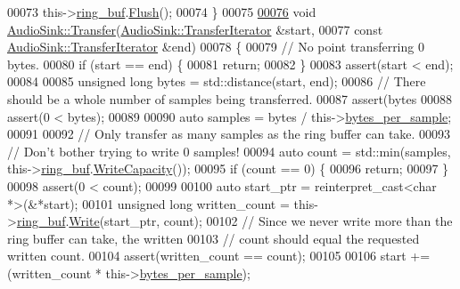 \begin{DoxyCode}
00073     this->\hyperlink{classAudioSink_a87184f85d6cfcc7310043b877caeaee2}{ring\_buf}.\hyperlink{classRingBuffer_a1eb1acca6905e7678fbbdb70238cdc26}{Flush}();
00074 \}
00075 
\hypertarget{audio__sink_8cpp_source_l00076}{}\hyperlink{classAudioSink_a455e211f4f16eaa21e7b75412cc8a8ae}{00076} \textcolor{keywordtype}{void} \hyperlink{classAudioSink_a455e211f4f16eaa21e7b75412cc8a8ae}{AudioSink::Transfer}(\hyperlink{classAudioSink_a60c1743d66e02b77f04791e72fa4cd0b}{AudioSink::TransferIterator} &start,
00077                          \textcolor{keyword}{const} \hyperlink{classAudioSink_a60c1743d66e02b77f04791e72fa4cd0b}{AudioSink::TransferIterator} &end)
00078 \{
00079     \textcolor{comment}{// No point transferring 0 bytes.}
00080     \textcolor{keywordflow}{if} (start == end) \{
00081         \textcolor{keywordflow}{return};
00082     \}
00083     assert(start < end);
00084 
00085     \textcolor{keywordtype}{unsigned} \textcolor{keywordtype}{long} bytes = std::distance(start, end);
00086     \textcolor{comment}{// There should be a whole number of samples being transferred.}
00087     assert(bytes %
00088     assert(0 < bytes);
00089 
00090     \textcolor{keyword}{auto} samples = bytes / this->\hyperlink{classAudioSink_a5eab0f7111187c0416feb542010e4a2e}{bytes\_per\_sample};
00091 
00092     \textcolor{comment}{// Only transfer as many samples as the ring buffer can take.}
00093     \textcolor{comment}{// Don't bother trying to write 0 samples!}
00094     \textcolor{keyword}{auto} count = std::min(samples, this->\hyperlink{classAudioSink_a87184f85d6cfcc7310043b877caeaee2}{ring\_buf}.\hyperlink{classRingBuffer_ab00617ab6e379ad146cb7b80079f4c4c}{WriteCapacity}());
00095     \textcolor{keywordflow}{if} (count == 0) \{
00096         \textcolor{keywordflow}{return};
00097     \}
00098     assert(0 < count);
00099 
00100     \textcolor{keyword}{auto} start\_ptr = \textcolor{keyword}{reinterpret\_cast<}\textcolor{keywordtype}{char} *\textcolor{keyword}{>}(&*start);
00101     \textcolor{keywordtype}{unsigned} \textcolor{keywordtype}{long} written\_count = this->\hyperlink{classAudioSink_a87184f85d6cfcc7310043b877caeaee2}{ring\_buf}.\hyperlink{classRingBuffer_aa7f863968cb641946b0cf341bda11e16}{Write}(start\_ptr, count);
00102     \textcolor{comment}{// Since we never write more than the ring buffer can take, the written}
00103     \textcolor{comment}{// count should equal the requested written count.}
00104     assert(written\_count == count);
00105 
00106     start += (written\_count * this->\hyperlink{classAudioSink_a5eab0f7111187c0416feb542010e4a2e}{bytes\_per\_sample});

\end{DoxyCode}
